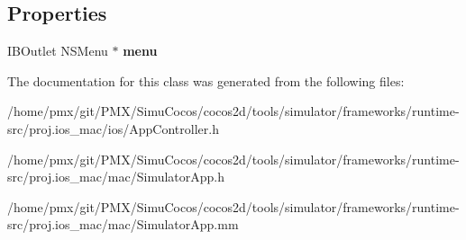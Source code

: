 \subsection*{Properties}
\begin{DoxyCompactItemize}
\item 
\mbox{\label{interfaceAppController_a8ab03c0f57e5d7f2d5770e5eb9f7244c}} 
I\+B\+Outlet N\+S\+Menu $\ast$ {\bfseries menu}
\end{DoxyCompactItemize}


The documentation for this class was generated from the following files\+:\begin{DoxyCompactItemize}
\item 
/home/pmx/git/\+P\+M\+X/\+Simu\+Cocos/cocos2d/tools/simulator/frameworks/runtime-\/src/proj.\+ios\+\_\+mac/ios/App\+Controller.\+h\item 
/home/pmx/git/\+P\+M\+X/\+Simu\+Cocos/cocos2d/tools/simulator/frameworks/runtime-\/src/proj.\+ios\+\_\+mac/mac/Simulator\+App.\+h\item 
/home/pmx/git/\+P\+M\+X/\+Simu\+Cocos/cocos2d/tools/simulator/frameworks/runtime-\/src/proj.\+ios\+\_\+mac/mac/Simulator\+App.\+mm\end{DoxyCompactItemize}
